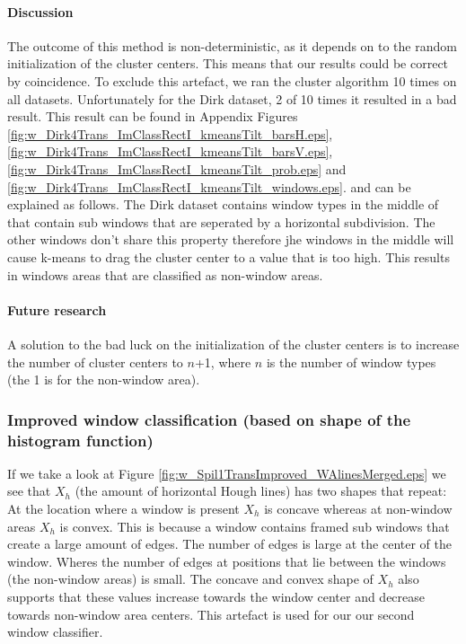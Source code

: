 

\paragraph{Discussion}  %
The outcome of this method is non-deterministic, as it depends on to the random
initialization of the cluster centers. This means that our results could be
correct by coincidence.  To exclude this artefact, we ran the cluster algorithm
10 times on all datasets. Unfortunately for the Dirk dataset, 2 of 10 times it 
resulted in a bad result. This result can be found in Appendix
Figures \ref{fig:w_Dirk4Trans_ImClassRectI_kmeansTilt_barsH.eps},
\ref{fig:w_Dirk4Trans_ImClassRectI_kmeansTilt_barsV.eps},
\ref{fig:w_Dirk4Trans_ImClassRectI_kmeansTilt_prob.eps} and
\ref{fig:w_Dirk4Trans_ImClassRectI_kmeansTilt_windows.eps}.
and can be explained as follows. The Dirk dataset contains window types in the
middle of that contain sub windows that are seperated by a horizontal
subdivision. The other windows don't share this property therefore 
jhe windows in the middle will cause k-means to drag the cluster center to a
value that is too high. This results in windows areas that are  classified as non-window areas.

\paragraph{Future research}
A solution to the bad luck on the initialization of the cluster centers 
is to increase the number of cluster centers to $n$+1, 
where $n$ is the number of window types (the 1 is for the non-window area).




\newpage
\subsubsection{Improved window classification (based on shape of the histogram function)}
If we take a look at Figure \ref{fig:w_Spil1TransImproved_WAlinesMerged.eps}
we see that $X_h$ (the amount of horizontal Hough lines) has two shapes that
repeat:  At the location where a window is present $X_h$ is concave whereas at
non-window areas $X_h$ is convex. 
This is because a window contains framed sub windows that create 
a large amount of edges. The number of edges is large at the center of the
window.  Wheres the number of edges at positions that lie between the windows
(the non-window areas) is small.
The concave and convex shape of $X_h$ also supports that these values 
increase towards the window center and decrease towards
non-window area centers. This artefact is used for our 
our second window classifier.\\

